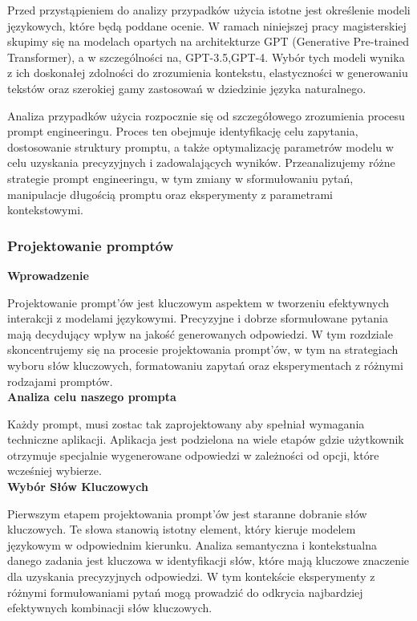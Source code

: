Przed przystąpieniem do analizy przypadków użycia istotne jest określenie modeli językowych, które będą poddane ocenie. W ramach niniejszej pracy magisterskiej skupimy się na modelach opartych na architekturze GPT (Generative Pre-trained Transformer), a w szczególności na, GPT-3.5,GPT-4. Wybór tych modeli wynika z ich doskonałej zdolności do zrozumienia kontekstu, elastyczności w generowaniu tekstów oraz szerokiej gamy zastosowań w dziedzinie języka naturalnego.
 
Analiza przypadków użycia rozpocznie się od szczegółowego zrozumienia procesu prompt engineeringu. Proces ten obejmuje identyfikację celu zapytania, dostosowanie struktury promptu, a także optymalizację parametrów modelu w celu uzyskania precyzyjnych i zadowalających wyników. Przeanalizujemy różne strategie prompt engineeringu, w tym zmiany w sformułowaniu pytań, manipulacje długością promptu oraz eksperymenty z parametrami kontekstowymi.

\subsubsection{Projektowanie promptów}

\noindent\textbf{Wprowadzenie}

Projektowanie prompt'ów jest kluczowym aspektem w tworzeniu efektywnych interakcji z modelami językowymi. Precyzyjne i dobrze sformułowane pytania mają decydujący wpływ na jakość generowanych odpowiedzi. W tym rozdziale skoncentrujemy się na procesie projektowania prompt'ów, w tym na strategiach wyboru słów kluczowych, formatowaniu zapytań oraz eksperymentach z różnymi rodzajami promptów.
\\

\noindent\textbf{Analiza celu naszego prompta}

Każdy prompt, musi zostac tak zaprojektowany aby spełniał wymagania techniczne aplikacji.
Aplikacja jest podzielona na wiele etapów gdzie użytkownik otrzymuje specjalnie wygenerowane odpowiedzi w zależności od opcji, które wcześniej wybierze.
\\

\noindent\textbf{Wybór Słów Kluczowych}

Pierwszym etapem projektowania prompt'ów jest staranne dobranie słów kluczowych. Te słowa stanowią istotny element, który kieruje modelem językowym w odpowiednim kierunku. Analiza semantyczna i kontekstualna danego zadania jest kluczowa w identyfikacji słów, które mają kluczowe znaczenie dla uzyskania precyzyjnych odpowiedzi. W tym kontekście eksperymenty z różnymi formułowaniami pytań mogą prowadzić do odkrycia najbardziej efektywnych kombinacji słów kluczowych.
\\

